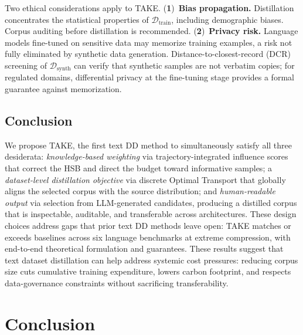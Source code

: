\documentclass[12pt, a4paper, twoside]{book}
\numberwithin{equation}{chapter}
\theoremstyle{plain}
\theoremstyle{definition}
\theoremstyle{remark}
\newenvironment{foldable}{}{}
\begin{document}
\begin{foldable} Two ethical considerations apply to TAKE.
  (\textbf{1})~\textbf{Bias propagation.}
  Distillation concentrates the statistical properties of $\mathcal{D}_\text{train}$, including demographic biases.
  Corpus auditing before distillation is recommended.
  (\textbf{2})~\textbf{Privacy risk.}
  Language models fine-tuned on sensitive data may memorize training examples, a risk not fully eliminated by synthetic data generation.
  Distance-to-closest-record (DCR) screening of $\mathcal{D}_\text{synth}$ can verify that synthetic samples are not verbatim copies; for regulated domains, differential privacy at the fine-tuning stage provides a formal guarantee against memorization.
\end{foldable}
 \section{Conclusion} \label{sec:56-research03-conclusion}

\begin{foldable} We propose TAKE, the first text \ac{DD} method to simultaneously satisfy all three desiderata: \textit{knowledge-based weighting} via trajectory-integrated influence scores that correct the \acl{HSB} and direct the budget toward informative samples; a \textit{dataset-level distillation objective} via discrete Optimal Transport that globally aligns the selected corpus with the source distribution; and \textit{human-readable output} via selection from \ac{LLM}-generated candidates, producing a distilled corpus that is inspectable, auditable, and transferable across architectures.
  These design choices address gaps that prior text \ac{DD} methods leave open: TAKE matches or exceeds baselines across six language benchmarks at extreme compression, with end-to-end theoretical formulation and guarantees.
  These results suggest that text dataset distillation can help address systemic cost pressures: reducing corpus size cuts cumulative training expenditure, lowers carbon footprint, and respects data-governance constraints without sacrificing transferability.
\end{foldable}
 \clearpage{}
\clearpage{}\acresetall

\chapter{Conclusion} \label{ch:60-conclusion}
\end{document}
